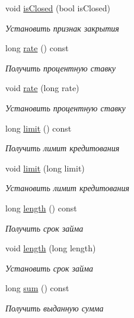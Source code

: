 \begin{DoxyCompactItemize}
void \hyperlink{classkpk_1_1data_1_1_loan_a582b7aa81d2087f14f69caf92254e865}{is\+Closed} (bool is\+Closed)
\begin{DoxyCompactList}\small\item\em Установить признак закрытия \end{DoxyCompactList}\item 
long \hyperlink{classkpk_1_1data_1_1_loan_affb2d1a39a5c7c185b07d5f6de87a43e}{rate} () const 
\begin{DoxyCompactList}\small\item\em Получить процентную ставку \end{DoxyCompactList}\item 
void \hyperlink{classkpk_1_1data_1_1_loan_aefef4f72d088471f5f32d1843c221108}{rate} (long rate)
\begin{DoxyCompactList}\small\item\em Установить процентную ставку \end{DoxyCompactList}\item 
long \hyperlink{classkpk_1_1data_1_1_loan_ae82f80aa7a9b58fdfb2ac818dd33611d}{limit} () const 
\begin{DoxyCompactList}\small\item\em Получить лимит кредитования \end{DoxyCompactList}\item 
void \hyperlink{classkpk_1_1data_1_1_loan_a83d5b22665f19627d26f3a57903511e6}{limit} (long limit)
\begin{DoxyCompactList}\small\item\em Установить лимит кредитования \end{DoxyCompactList}\item 
long \hyperlink{classkpk_1_1data_1_1_loan_a89c1fd9e63d8923796f0cb3452bafa27}{length} () const 
\begin{DoxyCompactList}\small\item\em Получить срок займа \end{DoxyCompactList}\item 
void \hyperlink{classkpk_1_1data_1_1_loan_af134c522e66faccb01b71c69c801ac6f}{length} (long length)
\begin{DoxyCompactList}\small\item\em Установить срок займа \end{DoxyCompactList}\item 
long \hyperlink{classkpk_1_1data_1_1_loan_a5b207380d82a2079ea83ec1ecf11f090}{sum} () const 
\begin{DoxyCompactList}\small\item\em Получить выданную сумма \end{DoxyCompactList}\item 

\end{DoxyCompactItemize}
